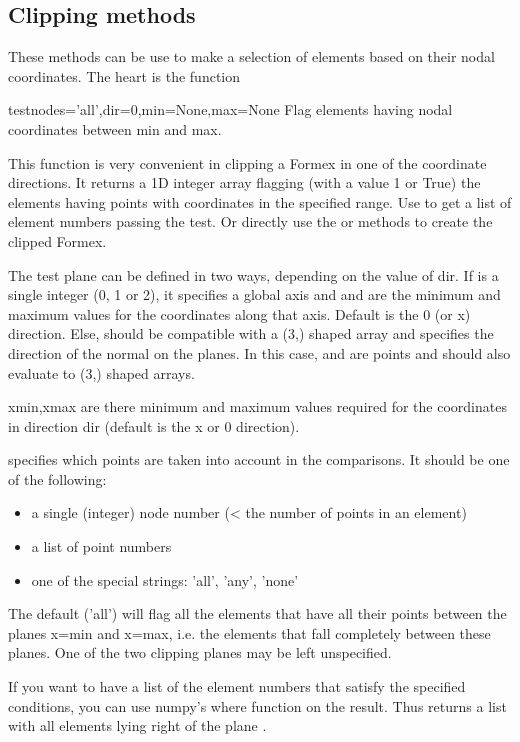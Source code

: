 \subsection{Clipping methods}
These methods can be use to make a selection of elements based on their nodal coordinates. The heart is the function
\begin{methoddesc}{test}{nodes='all',dir=0,min=None,max=None}
Flag elements having nodal coordinates between min and max.

This function is very convenient in clipping a Formex in one of
the coordinate directions. It returns a 1D integer array flagging
(with a value 1 or True) the elements having points with coordinates in the
specified range.
Use  to get a list of element numbers passing the test.
Or directly use the  or  methods to create the clipped Formex.
       
The test plane can be defined in two ways, depending on the value of dir.
If  is a single integer (0, 1 or 2), it specifies a global axis
and  and  are the minimum and maximum values for the
coordinates along that axis.
Default is the 0 (or x) direction.
Else,  should be compatible with a (3,) shaped array and specifies
the direction of the normal on the planes. In this case,  and 
are points and should also evaluate to (3,) shaped arrays.

xmin,xmax are there minimum and maximum values required for the
coordinates in direction dir (default is the x or 0 direction).

 specifies which points are taken into account in the comparisons.
It should be one of the following:
\begin{itemize}
\item a single (integer) node number (< the number of points in an element)
\item a list of point numbers
\item one of the special strings: 'all', 'any', 'none'
\end{itemize}
The default ('all') will flag all the elements that have all their
points between the planes x=min and x=max, i.e. the elements that
fall completely between these planes. One of the two clipping planes
may be left unspecified.
\end{methoddesc}

If you want to have a list of the element numbers that satisfy the specified conditions, you can use numpy's where function on the result. Thus  returns a list with all elements lying right of the plane .

